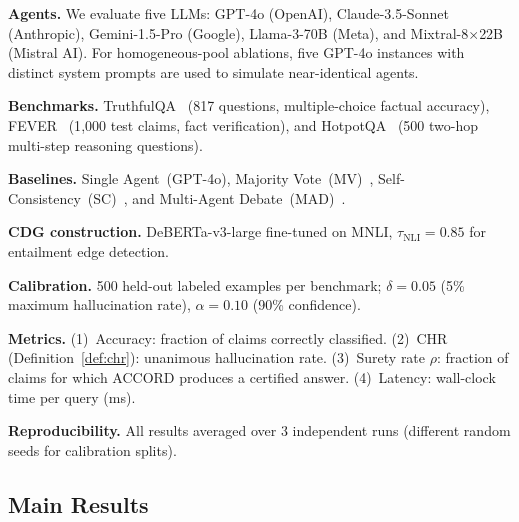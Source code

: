 \documentclass[conference]{IEEEtran}
\begin{document}
\textbf{Agents.}
We evaluate five LLMs:
GPT-4o (OpenAI), Claude-3.5-Sonnet (Anthropic),
Gemini-1.5-Pro (Google), Llama-3-70B (Meta), and
Mixtral-8$\times$22B (Mistral AI).
For homogeneous-pool ablations, five GPT-4o instances with
distinct system prompts are used to simulate near-identical agents.

\textbf{Benchmarks.}
TruthfulQA~\cite{lin2021truthfulqa} (817 questions,
multiple-choice factual accuracy),
FEVER~\cite{thorne2018fever} (1{,}000 test claims,
fact verification), and
HotpotQA~\cite{yang2018hotpotqa} (500 two-hop
multi-step reasoning questions).

\textbf{Baselines.}
Single Agent~(GPT-4o),
Majority Vote~(MV)~\cite{wang2022selfconsistency},
Self-Consistency~(SC)~\cite{wang2022selfconsistency}, and
Multi-Agent Debate~(MAD)~\cite{du2023debate}.

\textbf{CDG construction.}
DeBERTa-v3-large fine-tuned on MNLI,
$\tau_\text{NLI} = 0.85$ for entailment edge detection.

\textbf{Calibration.}
500 held-out labeled examples per benchmark;
$\delta = 0.05$ (5\% maximum hallucination rate),
$\alpha = 0.10$ (90\% confidence).

\textbf{Metrics.}
(1)~Accuracy: fraction of claims correctly classified.
(2)~CHR (Definition~\ref{def:chr}): unanimous hallucination rate.
(3)~Surety rate $\rho$: fraction of claims for which ACCORD
produces a certified answer.
(4)~Latency: wall-clock time per query (ms).

\textbf{Reproducibility.}
All results averaged over 3 independent runs (different
random seeds for calibration splits).

\subsection{Main Results}
\end{document}
